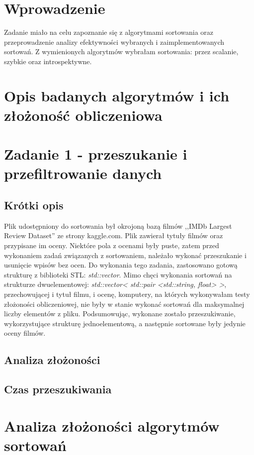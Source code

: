 \documentclass[12pt]{article}
\begin{document}
    

\tableofcontents
\newpage

\section{Wprowadzenie}
Zadanie miało na celu zapoznanie się z algorytmami sortowania oraz przeprowadzenie analizy efektywności wybranych i zaimplementowanych sortowań. Z wymienionych algorytmów wybrałam sortowania: przez scalanie, szybkie oraz introspektywne. 

\section{Opis badanych algorytmów i ich złożoność obliczeniowa}


\section{Zadanie 1 - przeszukanie i przefiltrowanie danych}
\subsection{Krótki opis}
Plik udostępniony do sortowania był okrojoną bazą filmów ,,IMDb Largest Review Dataset'' ze strony kaggle.com. Plik zawierał tytuły filmów oraz przypisane im oceny. Niektóre pola z ocenami były puste, zatem przed wykonaniem zadań związanych z sortowaniem, należało wykonać przeszukanie i usunięcie wpisów bez ocen. Do wykonania tego zadania, zastosowano gotową strukturę z biblioteki STL: \textit{std::vector}. Mimo chęci wykonania sortowań na strukturze dwuelementowej: \textit{std::vector< std::pair <std::string, float> >}, przechowującej i tytuł filmu, i ocenę, komputery, na których wykonywałam testy złożoności obliczeniowej, nie były w stanie wykonać sortowań dla maksymalnej liczby elementów z pliku. Podsumowując, wykonane zostało przeszukiwanie, wykorzystujące strukturę jednoelementową, a następnie sortowane były jedynie oceny filmów.
\subsection{Analiza złożoności}
\subsection{Czas przeszukiwania}

\section{Analiza złożoności algorytmów sortowań}
\end{document}
